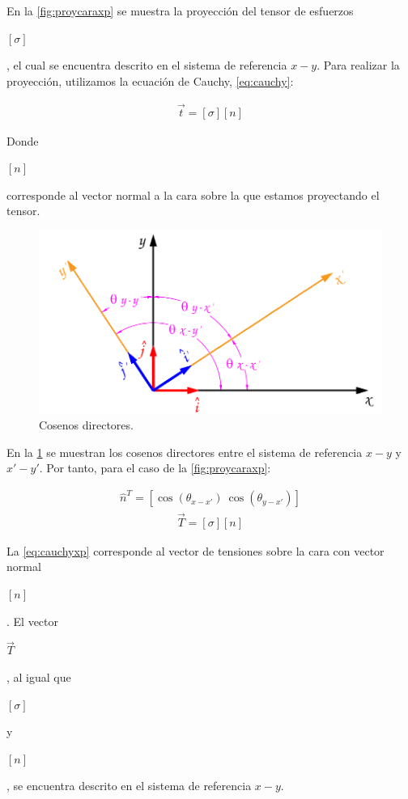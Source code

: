 \documentclass[12pt,letterpaper, twoside, openany]{article}
\begin{document}
%
En la \cref{fig:proycaraxp} se muestra la proyección del tensor de esfuerzos \begin{large}$\left[ \sigma \right]$\end{large}, el cual se encuentra descrito en el sistema de referencia $x-y$. Para realizar la proyección, utilizamos la ecuación de Cauchy, \cref{eq:cauchy}:
%
\begin{large}
	\begin{align}
		\overset{\rightarrow}{t}=\left[ \sigma \right] \left[n\right]
		\label{eq:cauchy}
	\end{align}
\end{large}
%
Donde \begin{large} $\left[ n \right]$\end{large} corresponde al vector normal a la cara sobre la que estamos proyectando el tensor. 
%
\begin{figure}[H]
	\centering
		\includegraphics[width=12 cm]{img/Directores2D.pdf}
		\caption{Cosenos directores.}
		\label{fig:directores2D}
\end{figure}
%
En la \cref{fig:directores2D} se muestran los cosenos directores entre el sistema de referencia $x-y$ y $x'-y'$. Por tanto, para el caso de la \cref{fig:proycaraxp}:
%
\begin{large}
	\begin{align}
		\hat{n}^T=\left[ \cos \left( \theta_{x-x'} \right)\ \cos \left( \theta_{y-x'} \right)\right]
		\label{eq:normaln}
	\end{align}
%
	\begin{align}
		\overset{\rightarrow}{T}=\left[ \sigma \right] \left[n\right]
		\label{eq:cauchyxp}
	\end{align}
\end{large}
%
La \cref{eq:cauchyxp} corresponde al vector de tensiones sobre la cara con vector normal \begin{large} $\left[ n \right]$\end{large}. El vector \begin{large} $\overset{\rightarrow}{T}$\end{large}, al igual que  \begin{large} $\left[ \sigma \right]$\end{large} y \begin{large} $\left[ n \right]$\end{large}, se encuentra descrito en el sistema de referencia $x-y$.
\end{document}
